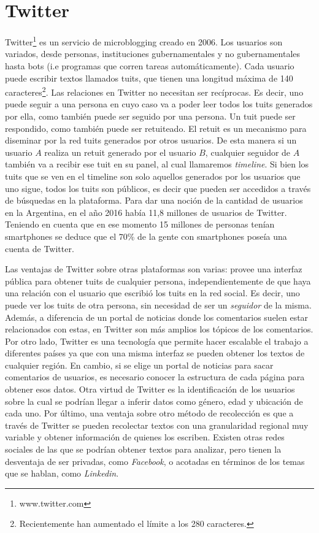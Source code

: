 \section{Twitter}
Twitter\footnote{www.twitter.com} es un servicio de microblogging creado en 2006. Los usuarios son variados, desde personas, instituciones gubernamentales y no gubernamentales hasta bots (i.e programas que corren tareas automáticamente). Cada usuario puede escribir textos llamados tuits, que tienen una longitud máxima de 140 caracteres\footnote{Recientemente han aumentado el límite a los 280 caracteres.}. Las relaciones en Twitter no necesitan ser recíprocas. Es decir, uno puede seguir a una persona en cuyo caso va a poder leer todos los tuits generados por ella, como también puede ser seguido por una persona. Un tuit puede ser respondido, como también puede ser retuiteado. El retuit es un mecanismo para diseminar por la red tuits generados por otros usuarios. De esta manera si un usuario $A$ realiza un retuit generado por el usuario $B$, cualquier seguidor de $A$ también va a recibir ese tuit en su panel, al cual llamaremos \textit{timeline}. Si bien los tuits que se ven en el timeline son solo aquellos generados por los usuarios que uno sigue, todos los tuits son públicos, es decir que pueden ser accedidos a través de búsquedas en la plataforma.
Para dar una noción de la cantidad de usuarios en la Argentina, en el año 2016 había 11,8 millones de usuarios de Twitter. Teniendo en cuenta que en ese momento 15 millones de personas tenían smartphones se deduce que el $70$\% de la gente con smartphones poseía una cuenta de Twitter.%

Las ventajas de Twitter sobre otras plataformas son varias: provee una interfaz pública para obtener tuits de cualquier persona, independientemente de que haya una relación con el usuario que escribió los tuits en la red social. Es decir, uno puede ver los tuits de otra persona, sin necesidad de ser un \textit{seguidor} de la misma. Además, a diferencia de un portal de noticias donde los comentarios suelen estar relacionados con estas, en Twitter son más amplios los tópicos de los comentarios.
Por otro lado, Twitter es una tecnología que permite hacer escalable el trabajo a diferentes países ya que con una misma interfaz se pueden obtener los textos de cualquier región. En cambio, si se elige un portal de noticias para sacar comentarios de usuarios, es necesario conocer la estructura de cada página para obtener esos datos.
Otra virtud de Twitter es la identificación de los usuarios sobre la cual se podrían llegar a inferir datos como género, edad y ubicación de cada uno.
Por último, una ventaja sobre otro método de recolección es que a través de Twitter se pueden recolectar textos con una granularidad regional muy variable y obtener información de quienes los escriben.
Existen otras redes sociales de las que se podrían obtener textos para analizar, pero tienen la desventaja de ser privadas, como \textit{Facebook}, o acotadas en términos de los temas que se hablan, como \textit{Linkedin}. 


